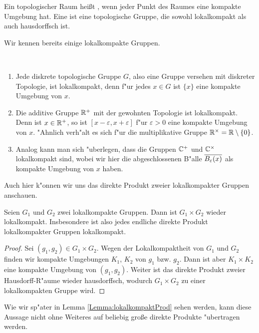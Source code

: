 	
	\begin{defi}
		Ein topologischer Raum heißt , wenn jeder Punkt des Raumes eine kompakte Umgebung hat. 
		Eine  ist eine topologische Gruppe, die sowohl lokalkompakt als auch hausdorffsch ist. 
	\end{defi}
	Wir kennen bereits einige lokalkompakte Gruppen.
	\begin{bsp}~ 
		\begin{enumerate}[label=(\roman*)]
			\item Jede diskrete topologische Gruppe $G$, also eine Gruppe versehen mit diskreter Topologie, ist lokalkompakt, denn f"ur jedes $x \in G$ ist $\{x\}$ eine kompakte Umgebung von $x$.
			\item Die additive Gruppe $\mathbb{R}^+$ mit der gewohnten Topologie ist lokalkompakt. Denn ist $x\in\mathbb{R}^+$, so ist $[x-\varepsilon, x+\varepsilon]$ f"ur $\varepsilon>0$ eine kompakte Umgebung von $x$. "Ahnlich verh"alt es sich f"ur die multiplikative Gruppe $\mathbb{R}^\times = \mathbb{R} \setminus\{0\}$.
			\item Analog kann man sich "uberlegen, dass die Gruppen $\mathbb{C}^+$ und $\mathbb{C}^\times$ lokalkompakt sind, wobei wir hier die abgeschlossenen B"alle $\overline{B_\varepsilon(x)}$ als kompakte Umgebung von $x$ haben.
		\end{enumerate}
	\end{bsp}
	Auch hier k"onnen wir uns das direkte Produkt zweier lokalkompakter Gruppen anschauen. 
	\begin{lemma}
		Seien $G_1$ und $G_2$ zwei lokalkompakte Gruppen. Dann ist $G_1\times G_2$ wieder lokalkompakt. Insbesondere ist also jedes endliche direkte Produkt lokalkompakter Gruppen lokalkompakt.
	\end{lemma}
	\begin{proof}
		Sei $(g_1,g_2) \in G_1\times G_2$. Wegen der Lokalkompaktheit von $G_1$ und $G_2$ finden wir kompakte Umgebungen $K_1$, $K_2$ von $g_1$ bzw. $g_2$. Dann ist aber $K_1 \times K_2$ eine kompakte Umgebung von $(g_1,g_2)$. 
		Weiter ist das direkte Produkt zweier Hausdorff-R"aume wieder hausdorffsch, wodurch $G_1\times G_2$ zu einer lokalkompakten Gruppe wird.
	\end{proof}
	Wie wir sp"ater in Lemma \ref{Lemma:lokalkompaktProd} sehen werden, kann diese Aussage nicht ohne Weiteres auf beliebig gro\ss e direkte Produkte "ubertragen werden.

